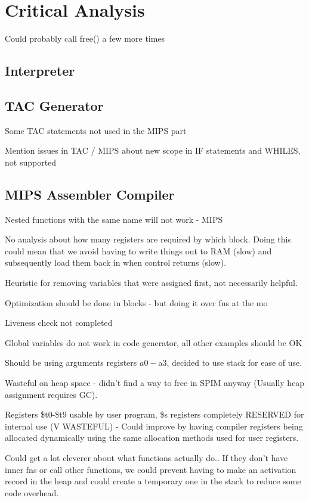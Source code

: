 \chapter{Critical Analysis}

Could probably call free() a few more times


\section{Interpreter}

\section{TAC Generator}
Some TAC statements not used in the MIPS part

Mention issues in TAC / MIPS about new scope in IF statements and WHILES, not supported


\section{MIPS Assembler Compiler}
Nested functions with the same name will not work - MIPS 

No analysis about how many registers are required by which block. Doing this could mean that we avoid having to write things out to RAM (slow) and subsequently load them back in when control returns (slow).

Heuristic for removing variables that were assigned first, not necessarily helpful.

Optimization should be done in blocks - but doing it over fns at the mo

Liveness check not completed

Global variables do not work in code generator, all other examples should be OK


Should be using arguments registers $a0-$a3, decided to use stack for ease of use.


Wasteful on heap space - didn't find a way to free in SPIM anyway (Usually heap assignment requires GC).

Registers \$t0-\$t9 usable by user program, \$s registers completely RESERVED for internal use (V WASTEFUL) - Could improve by having compiler registers being allocated dynamically using the same allocation methods used for user registers.


Could get a lot cleverer about what functions actually do.. If they don't have inner fns or call other functions, we could prevent having to make an activation record in the heap and could create a temporary one in the stack to reduce some code overhead. 
